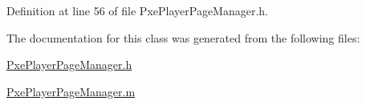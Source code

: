 Definition at line 56 of file Pxe\-Player\-Page\-Manager.\-h.



The documentation for this class was generated from the following files\-:\begin{DoxyCompactItemize}
\item 
\hyperlink{_pxe_player_page_manager_8h}{Pxe\-Player\-Page\-Manager.\-h}\item 
\hyperlink{_pxe_player_page_manager_8m}{Pxe\-Player\-Page\-Manager.\-m}\end{DoxyCompactItemize}
